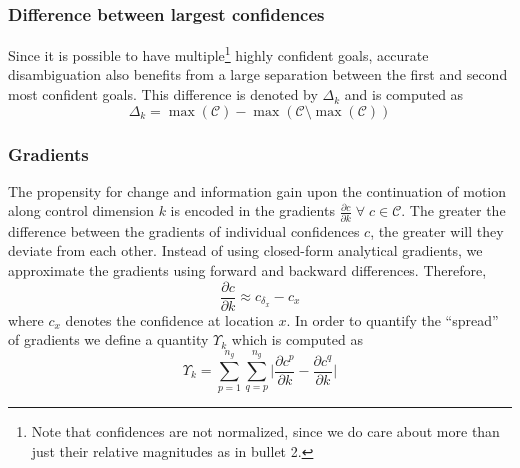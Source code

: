 \documentclass[conference]{IEEEtran}
\newcommand{\argmax}{\arg\!\max}
\begin{document}
\subsubsection{Difference between largest confidences}
%
Since it is possible to have multiple\footnote{Note that confidences are not normalized, since we do care about more than just their relative magnitudes as in bullet 2.} highly confident goals, accurate disambiguation also benefits from a large separation between the first and second most confident goals. 
This difference is denoted by $\Delta_{k}$ and is computed as
\begin{equation*}
\Delta_{k} = \max(\mathcal{C}) - \max(\mathcal{C} \setminus {\max(\mathcal{C})})
\end{equation*}
\subsubsection{Gradients}
The propensity for change and information gain upon the continuation of motion along control dimension $k$ is encoded in the gradients $\frac{\partial c}{\partial k}\; \forall\; c\in \mathcal{C}$. The greater the difference between the gradients of individual confidences $c$, the greater will they deviate from each other.  Instead of using closed-form analytical gradients, we approximate the gradients using forward and backward differences. Therefore, 
\begin{equation*}
\frac{\partial c}{\partial k} \approx c_{\delta_x} - c_{x} 
\end{equation*}
where $c_x$ denotes the confidence at location $x$.
In order to quantify the ``spread'' of gradients we define a quantity $\Upsilon_{k}$ which is computed as 
\begin{equation*}
\Upsilon_{k} = \sum_{p=1}^{n_g}\sum_{q=p}^{n_g}\Big \lvert\frac{\partial c^p}{\partial k} - \frac{\partial c^q}{\partial k}\Big \rvert
\end{equation*}
\end{document}
